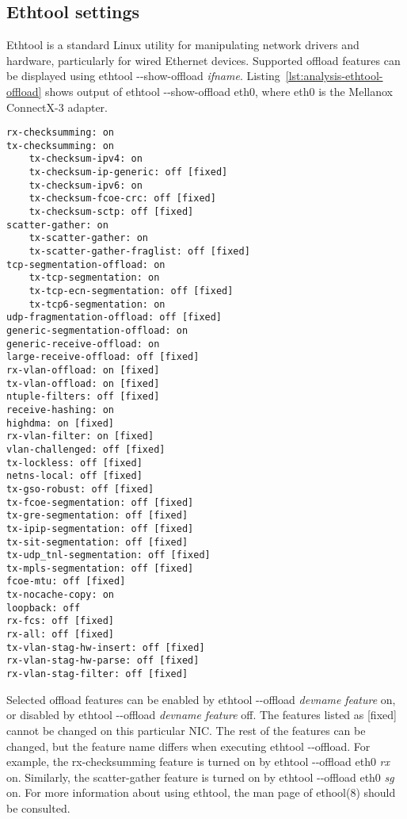 
\subsection{Ethtool settings}\label{sub:analysis-settings-ethtool}
Ethtool is a standard Linux utility for manipulating network drivers and hardware, particularly for
wired Ethernet devices.
Supported offload features can be displayed using ethtool -{}-show-offload {\it{ifname}}.
Listing~\ref{lst:analysis-ethtool-offload} shows output of ethtool -{}-show-offload eth0,
where eth0 is the Mellanox ConnectX-3 adapter.

\begin{lstlisting}[caption={Output of ethtool -{}-show-offload for Mellanox ConnectX3 adapter},label={lst:analysis-ethtool-offload}]
rx-checksumming: on
tx-checksumming: on
	tx-checksum-ipv4: on
	tx-checksum-ip-generic: off [fixed]
	tx-checksum-ipv6: on
	tx-checksum-fcoe-crc: off [fixed]
	tx-checksum-sctp: off [fixed]
scatter-gather: on
	tx-scatter-gather: on
	tx-scatter-gather-fraglist: off [fixed]
tcp-segmentation-offload: on
	tx-tcp-segmentation: on
	tx-tcp-ecn-segmentation: off [fixed]
	tx-tcp6-segmentation: on
udp-fragmentation-offload: off [fixed]
generic-segmentation-offload: on
generic-receive-offload: on
large-receive-offload: off [fixed]
rx-vlan-offload: on [fixed]
tx-vlan-offload: on [fixed]
ntuple-filters: off [fixed]
receive-hashing: on
highdma: on [fixed]
rx-vlan-filter: on [fixed]
vlan-challenged: off [fixed]
tx-lockless: off [fixed]
netns-local: off [fixed]
tx-gso-robust: off [fixed]
tx-fcoe-segmentation: off [fixed]
tx-gre-segmentation: off [fixed]
tx-ipip-segmentation: off [fixed]
tx-sit-segmentation: off [fixed]
tx-udp_tnl-segmentation: off [fixed]
tx-mpls-segmentation: off [fixed]
fcoe-mtu: off [fixed]
tx-nocache-copy: on
loopback: off
rx-fcs: off [fixed]
rx-all: off [fixed]
tx-vlan-stag-hw-insert: off [fixed]
rx-vlan-stag-hw-parse: off [fixed]
rx-vlan-stag-filter: off [fixed]
\end{lstlisting}

Selected offload features can be enabled by ethtool -{}-offload {\it{devname}} {\it{feature}} on,
or disabled by ethtool -{}-offload {\it{devname}} {\it{feature}} off.
The features listed as [fixed] cannot be changed on this particular NIC.
The rest of the features can be changed, but the feature name differs when executing ethtool -{}-offload.
For example, the rx-checksumming feature is turned on by ethtool -{}-offload eth0 {\it{rx}} on.
Similarly, the scatter-gather feature is turned on by ethtool -{}-offload eth0 {\it{sg}} on.
For more information about using ethtool, the man page of ethool(8) should be consulted.

